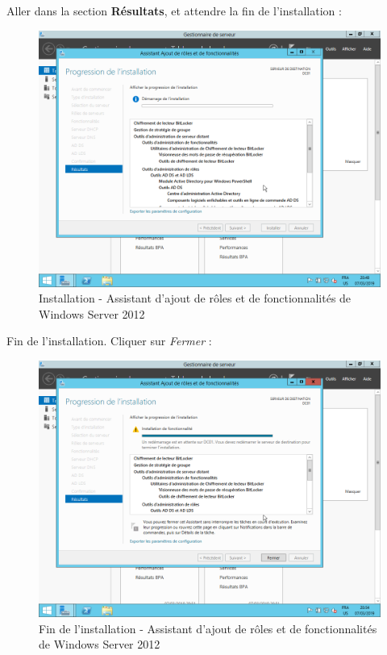 \newpage
Aller dans la section \textbf{Résultats}, et attendre la fin de l'installation :
\begin{figure}[h!]
    \begin{center}
        \includegraphics[scale=0.6]{WS2012_Screenshots/32.png}
        \caption{Installation - Assistant d'ajout de rôles et de fonctionnalités de Windows Server 2012}
        \label{WS2012_Screenshots/32}
    \end{center}
\end{figure}
\FloatBarrier

\newpage
Fin de l'installation. Cliquer sur \textit{Fermer} :
\begin{figure}[h!]
    \begin{center}
        \includegraphics[scale=0.6]{WS2012_Screenshots/33.png}
        \caption{Fin de l'installation - Assistant d'ajout de rôles et de fonctionnalités de Windows Server 2012}
        \label{WS2012_Screenshots/33}
    \end{center}
\end{figure}
\FloatBarrier

